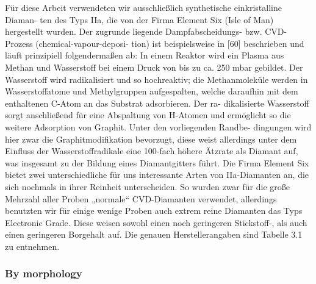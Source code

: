       Für diese Arbeit verwendeten wir ausschließlich synthetische einkristalline Diaman- ten des Typs IIa, die von der Firma Element Six (Isle of Man) hergestellt wurden. Der zugrunde liegende Dampfabscheidungs- bzw. CVD-Prozess (chemical-vapour-deposi- tion) ist beispielsweise in [60] beschrieben und läuft prinzipiell folgendermaßen ab: In einem Reaktor wird ein Plasma aus Methan und Wasserstoff bei einem Druck von bis zu ca. 250 mbar gebildet. Der Wasserstoff wird radikalisiert und so hochreaktiv; die Methanmoleküle werden in Wasserstoffatome und Methylgruppen aufgespalten, welche daraufhin mit dem enthaltenen C-Atom an das Substrat adsorbieren. Der ra- dikalisierte Wasserstoff sorgt anschließend für eine Abspaltung von H-Atomen und ermöglicht so die weitere Adsorption von Graphit. Unter den vorliegenden Randbe- dingungen wird hier zwar die Graphitmodifikation bevorzugt, diese weist allerdings unter dem Einfluss der Wasserstoffradikale eine 100-fach höhere Ätzrate als Diamant auf, was insgesamt zu der Bildung eines Diamantgitters führt.
      Die Firma Element Six bietet zwei unterschiedliche für uns interessante Arten von IIa-Diamanten an, die sich nochmals in ihrer Reinheit unterscheiden. So wurden zwar für die große Mehrzahl aller Proben „normale“ CVD-Diamanten verwendet, allerdings benutzten wir für einige wenige Proben auch extrem reine Diamanten das Typs Electronic Grade. Diese weisen sowohl einen noch geringeren Stickstoff-, als auch einen geringeren Borgehalt auf. Die genauen Herstellerangaben sind Tabelle 3.1 zu entnehmen.


    \subsubsection{By morphology}

